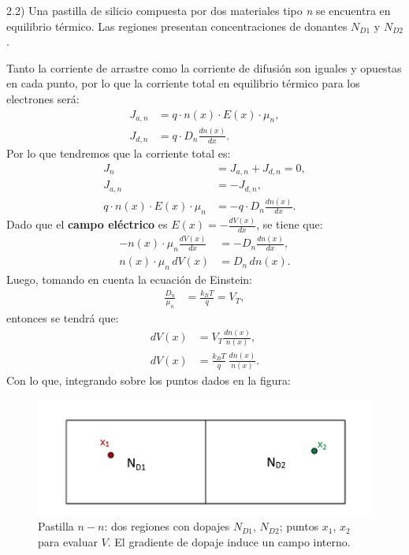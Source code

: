 \newpage
\begin{tcolorbox}
{\color{blue}
2.2) Una pastilla de silicio compuesta por dos materiales tipo \textit{n} se encuentra en equilibrio térmico. Las regiones presentan concentraciones de donantes \(N_{D1}\) y \(N_{D2}\).}
\end{tcolorbox}
Tanto la corriente de arrastre como la corriente de difusión son iguales y opuestas en cada punto, por lo que la corriente total en equilibrio térmico para los electrones será:
\begin{align}
    J_{a,n} &= q\cdot n(x)\cdot E(x)\cdot \mu_n,\\
    J_{d,n} &= q\cdot D_n \frac{dn(x)}{dx}.
\end{align}
Por lo que tendremos que la corriente total es:
\begin{align}
    J_{n} &= J_{a,n} + J_{d,n} = 0,\\
    J_{a,n} &= -J_{d,n},\\
    q\cdot n(x)\cdot E(x)\cdot \mu_n &= -q\cdot D_n \frac{dn(x)}{dx}.
\end{align}
Dado que el \textbf{campo eléctrico} es \(E(x)=-\frac{dV(x)}{dx}\), se tiene que: 
\begin{align}
    -n(x)\cdot \mu_n \frac{dV(x)}{dx} &= -D_n \frac{dn(x)}{dx},\\
    n(x)\cdot \mu_n\, dV(x) &= D_n\, dn(x).
\end{align}
Luego, tomando en cuenta la ecuación de Einstein:
\begin{align}
    \frac{D_n}{\mu_n} &= \frac{k_B T}{q} = V_T,
\end{align}
entonces se tendrá que:
\begin{align}
    dV(x) &= V_T \frac{dn(x)}{n(x)},\\
    dV(x) &= \frac{k_B T}{q}\,\frac{dn(x)}{n(x)}.
\end{align}
Con lo que, integrando sobre los puntos dados en la figura:
\begin{figure}
    \centering
    \includegraphics[scale=1]{img/P1_3.png}
    \caption{Pastilla \(n\!-\!n\): dos regiones con dopajes \(N_{D1}\), \(N_{D2}\); puntos \(x_1\), \(x_2\) para evaluar \(V\). El gradiente de dopaje induce un campo interno.}
\end{figure}
